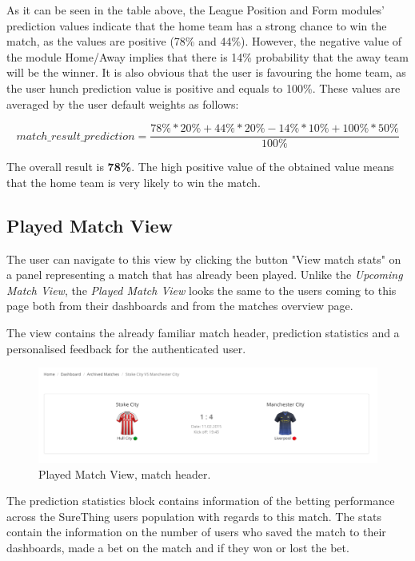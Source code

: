 As it can be seen in the table above, the League Position and Form modules’ prediction values indicate that the home team has a strong chance to win the match, as the values are positive (78\% and 44\%). However, the negative value of the module Home/Away implies that there is 14\% probability that the away team will be the winner. It is also obvious that the user is favouring the home team, as the user hunch prediction value is positive and equals to 100\%. These values are averaged by the user default weights as follows:

\begin{equation}
  match\_result\_prediction = \frac{78\%*20\% + 44\%*20\% -14\%*10\% + 100\%*50\%}{100\%}
\end{equation}

The overall result is \textbf{78\%}. The high positive value of the obtained value means that the home team is very likely to win the match.


\subsection{Played Match View}
\label{subsec:playedmatchview}
The user can navigate to this view by clicking the button "View match stats" on a panel representing a match that has already been played. Unlike the \emph{Upcoming Match View}, the \emph{Played Match View} looks the same to the users coming to this page both from their dashboards and from the matches overview page.

The view contains the already familiar match header, prediction statistics and a personalised feedback for the authenticated user.

\begin{figure}[H]
	\begin{center}
		\includegraphics[width=.90\textwidth]{impl/images/matchHeader}
		\caption{Played Match View, match header.} \label{fig:matchheader}
	\end{center}
\end{figure}

The prediction statistics block contains information of the betting performance across the SureThing users population with regards to this match. The stats contain the information on the number of users who saved the match to their dashboards, made a bet on the match and if they won or lost the bet.

